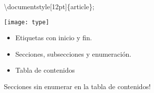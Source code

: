 \begin{frame}
    
    \textbackslash documentstyle[12pt]\{article\};
         
    \texttt{[image: type]}\\   
   
    \begin{itemize}    
        \item Etiquetas con inicio y fin.
        \item Secciones, subsecciones y enumeración.
        \item Tabla de contenidos        
    \end{itemize}
    
        Secciones sin enumerar en la tabla de contenidos!
    
\end{frame}

